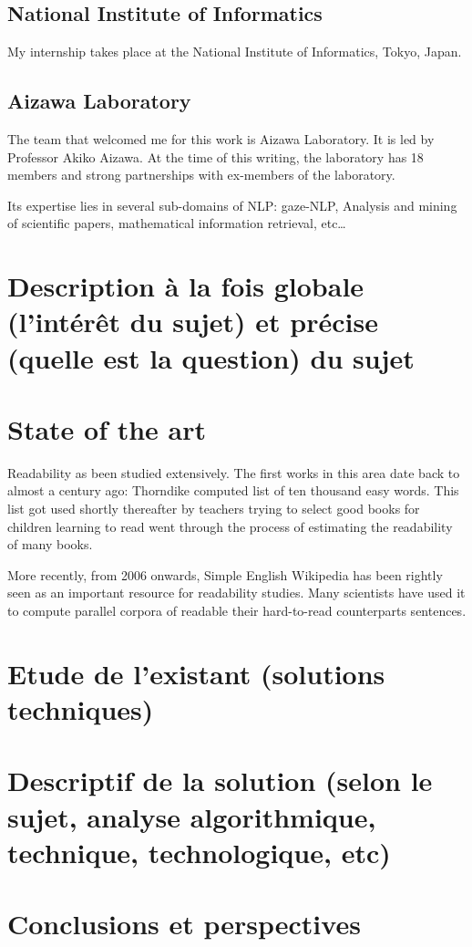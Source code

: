 \documentclass[a4paper]{scrreprt}
\begin{document}
\section{National Institute of Informatics}
\label{sec:national-institute-of-informatics}

My internship takes place at the National Institute of Informatics,
Tokyo, Japan. 

\section{Aizawa Laboratory}
\label{sec:aizawa-laboratory}

The team that welcomed me for this work is Aizawa Laboratory. It is
led by Professor Akiko Aizawa. At the time of this writing, the
laboratory has 18 members and strong partnerships with ex-members of
the laboratory.

Its expertise lies in several sub-domains of NLP: gaze-NLP, Analysis
and mining of scientific papers, mathematical information retrieval, etc…

\chapter{Description à la fois globale (l'intérêt du sujet) et précise (quelle est la question) du sujet}

\chapter{State of the art}
\label{sec:sota}

Readability as been studied extensively. The first works in this area
date back to almost a century ago: Thorndike computed list of ten
thousand easy words. This list got used shortly thereafter by teachers
trying to select good books for children learning to read went through
the process of estimating the readability of many books.

More recently, from 2006 onwards, Simple English Wikipedia has been
rightly seen as an important resource for readability studies. Many
scientists have used it to compute parallel corpora of readable their
hard-to-read counterparts sentences.

\chapter{Etude de l'existant (solutions techniques)}



\chapter{Descriptif de la solution (selon le sujet, analyse algorithmique, technique, technologique, etc)}
\chapter{Conclusions  et perspectives}
\end{document}
